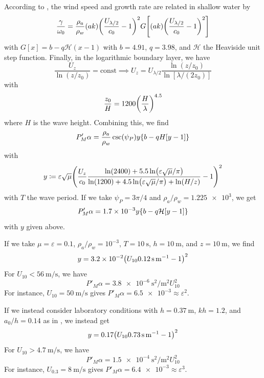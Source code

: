 \documentclass{jfm}
\renewcommand*{\epsilon}{\varepsilon}
\begin{document}
According to \citet{donelan2006wave}, the wind speed and growth rate
are related in shallow water by
\[
  \frac{\gamma}{\omega_0} = \frac{\rho_a}{\rho_w} (ak)
  \pqty{\frac{U_{\lambda/2}}{c_0} - 1}^2
  G \bqty{(ak)
  \pqty{\frac{U_{\lambda/2}}{c_0} - 1}^2}
\]
with $G[x] = b - q \mathcal{H}(x - 1)$ with $b = 4.91$, $q = 3.98$, and
$\mathcal{H}$ the Heaviside unit step function.
Finally, in the logarithmic boundary layer, we have
\[
  \frac{U_z}{\ln(z/z_0)} = \text{const}
  \implies U_{z} = U_{\lambda/2} \frac{\ln(z/z_0)}{\ln[\lambda/(2 z_0)]}
\]
with \citep{taylor2001dependence}
\[
  \frac{z_0}{H} = 1200 \pqty{\frac{H}{\lambda}}^{4.5}
\]
where $H$ is the wave height.
Combining this, we find
\[
  P'_M \alpha = \frac{\rho_a}{\rho_w} \csc(\psi_P)
  y \Bqty{b-qH[y - 1]}
\]
with
\[
  y \coloneqq
  \epsilon \sqrt{\mu}
  \pqty{\frac{U_{z}}{c_0} \frac{\ln(2400)+5.5\ln(\epsilon \sqrt{\mu}/\pi)}
    {\ln(1200) + 4.5 \ln(\epsilon \sqrt{\mu}/\pi) + \ln(H/z)} - 1}^2
\]
with $T$ the wave period.
If we take $\psi_P = 3\pi/4$ and $\rho_a/\rho_w = \num{1.225e3}$, we get
\[
  P'_M \alpha = \num{1.7e-3} y \Bqty{b-q \mathcal{H}[y - 1]}
\]
with $y$ given above.

If we take $\mu = \epsilon = 0.1$, $\rho_a/\rho_w = 10^{-3}$, $T =
\SI{10}{\second}$, $h = \SI{10}{\meter}$, and $z = \SI{10}{\meter}$, we
find
\[
  y = \num{3.2e-2} \pqty{U_{10} \SI{0.12}{\second\per\meter} - 1}^2
\]
For $U_{10} < \SI{56}{\meter\per\second}$, we have
\[
  P'_M \alpha = \SI{3.8e-6}{\second\squared\per\meter\squared} U_{10}^2
\]
For instance, $U_{10} = \SI{50}{\meter\per\second}$ gives
$P'_M \alpha = \num{6.5e-3} \approx \epsilon^2$.

If we instead consider laboratory conditions with $h=\SI{0.37}{\meter}$,
$kh = 1.2$, and $a_0/h = 0.14$ as in \citet{feddersen2005wind}, we
instead get
\[
  y = \num{0.17} \pqty{U_{10} \SI{0.73}{\second\per\meter} - 1}^2
\]
For $U_{10} > \SI{4.7}{\meter\per\second}$, we have
\[
  P'_M \alpha = \SI{1.5e-4}{\second\squared\per\meter\squared} U_{10}^2
\]
For instance, $U_{0.3} = \SI{8}{\meter\per\second}$ gives
$P'_M \alpha = \num{6.4e-3} \approx \epsilon^3$.
\end{document}
